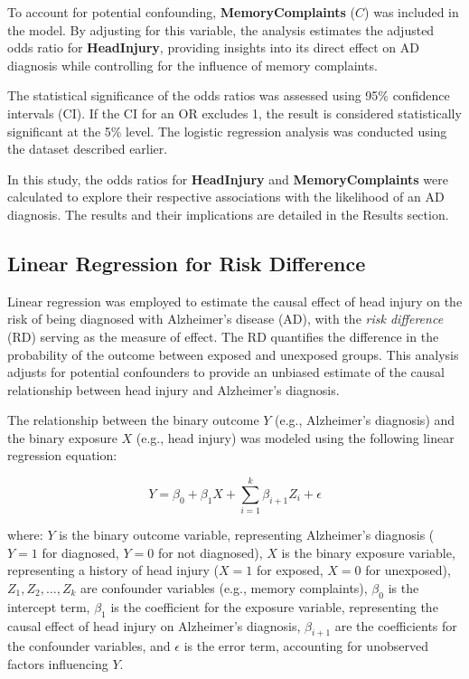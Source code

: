 \documentclass[12pt]{article}
\begin{document}
To account for potential confounding, \textbf{MemoryComplaints} (\( C \)) was included in the model. By adjusting for this variable, the analysis estimates the adjusted odds ratio for \textbf{HeadInjury}, providing insights into its direct effect on AD diagnosis while controlling for the influence of memory complaints.

The statistical significance of the odds ratios was assessed using 95\% confidence intervals (CI). If the CI for an OR excludes 1, the result is considered statistically significant at the 5\% level. The logistic regression analysis was conducted using the dataset described earlier.

In this study, the odds ratios for \textbf{HeadInjury} and \textbf{MemoryComplaints} were calculated to explore their respective associations with the likelihood of an AD diagnosis. The results and their implications are detailed in the Results section.

\subsection{Linear Regression for Risk Difference}

Linear regression was employed to estimate the causal effect of head injury on the risk of being diagnosed with Alzheimer's disease (AD), with the \textit{risk difference} (RD) serving as the measure of effect. The RD quantifies the difference in the probability of the outcome between exposed and unexposed groups. This analysis adjusts for potential confounders to provide an unbiased estimate of the causal relationship between head injury and Alzheimer's diagnosis.

The relationship between the binary outcome \( Y \) (e.g., Alzheimer's diagnosis) and the binary exposure \( X \) (e.g., head injury) was modeled using the following linear regression equation:

\[
Y = \beta_0 + \beta_1 X + \sum_{i=1}^{k} \beta_{i+1} Z_i + \epsilon
\]

where:
\( Y \) is the binary outcome variable, representing Alzheimer's diagnosis (\( Y = 1 \) for diagnosed, \( Y = 0 \) for not diagnosed),
\( X \) is the binary exposure variable, representing a history of head injury (\( X = 1 \) for exposed, \( X = 0 \) for unexposed),
\( Z_1, Z_2, \dots, Z_k \) are confounder variables (e.g., memory complaints),
\( \beta_0 \) is the intercept term,
\( \beta_1 \) is the coefficient for the exposure variable, representing the causal effect of head injury on Alzheimer's diagnosis,
\( \beta_{i+1} \) are the coefficients for the confounder variables, and
\( \epsilon \) is the error term, accounting for unobserved factors influencing \( Y \).
\end{document}
